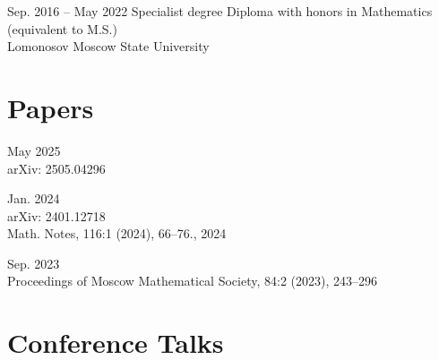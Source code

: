 \documentclass[11pt,letterpaper]{report}
\begin{document}
    \begin{tablist}

        \item[Sep. 2016 -- May 2022]  \tab{}Specialist degree Diploma with honors in Mathematics (equivalent to M.S.)\\ Lomonosov Moscow State University 

    \end{tablist}
    
    
    
    
    
    
      \section*{Papers}

    \begin{tablist}
	
	\item[May 2025] \\ arXiv: 2505.04296
        \item[Jan. 2024] \\ arXiv: 2401.12718\\ Math. Notes, 116:1 (2024), 66–76., 2024
        \item[Sep. 2023] \\ Proceedings of Moscow Mathematical Society, 84:2 (2023),  243–296
        
    \end{tablist}
    
    
        
    
    
    
    
    
     \section*{Conference Talks}
\end{document}
